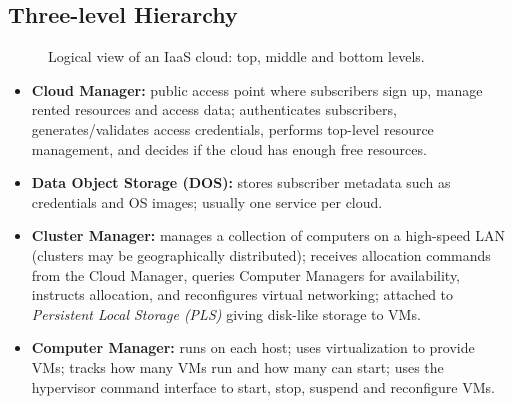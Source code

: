 \subsection{Three-level Hierarchy}
\begin{figure}[H]
\centering
{}
\caption{Logical view of an IaaS cloud: top, middle and bottom levels.}
\end{figure}

\begin{itemize}[leftmargin=*]
  \item \textbf{Cloud Manager:} public access point where subscribers sign up, manage rented resources and
        access data; authenticates subscribers, generates/validates access credentials, performs top-level
        resource management, and decides if the cloud has enough free resources.
  \item \textbf{Data Object Storage (DOS):} stores subscriber metadata such as credentials and OS images;
        usually one service per cloud.
  \item \textbf{Cluster Manager:} manages a collection of computers on a high-speed LAN (clusters may be
        geographically distributed); receives allocation commands from the Cloud Manager, queries Computer
        Managers for availability, instructs allocation, and reconfigures virtual networking; attached to
        \emph{Persistent Local Storage (PLS)} giving disk-like storage to VMs.
  \item \textbf{Computer Manager:} runs on each host; uses virtualization to provide VMs; tracks how many VMs
        run and how many can start; uses the hypervisor command interface to start, stop, suspend and
        reconfigure VMs.
\end{itemize}


